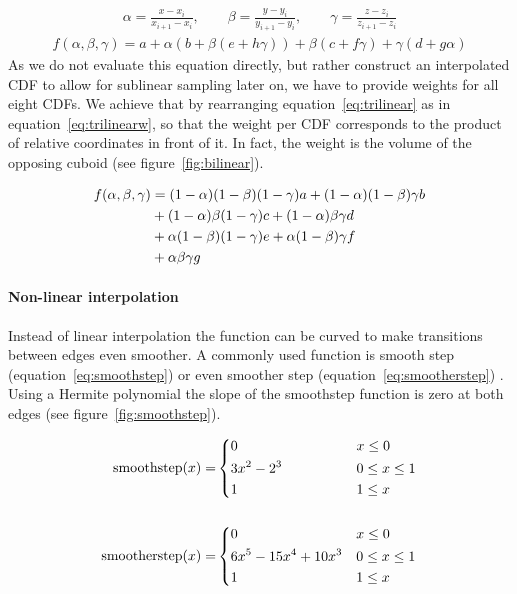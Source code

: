 \begin{align}
    \alpha = \frac{x-x_i}{x_{i+1}-x_i}, \qquad \beta = \frac{y-y_i}{y_{i+1}-y_i}, \qquad \gamma = \frac{z-z_i}{z_{i+1}-z_i}
\end{align}
\begin{align}\label{eq:trilinear}
    f(\alpha, \beta, \gamma) = a + \alpha\left(b + \beta(e + h\gamma)\right) + \beta(c + f\gamma) + \gamma(d + g\alpha)
\end{align}
As we do not evaluate this equation directly, but rather construct an interpolated CDF to allow for sublinear sampling later on, we have to provide weights for all eight CDFs. We achieve that by rearranging equation~\ref{eq:trilinear} as in equation~\ref{eq:trilinearw}, so that the weight per CDF corresponds to the product of relative coordinates in front of it. In fact, the weight is the volume of the opposing cuboid (see figure~\ref{fig:bilinear}).


\begin{align}\label{eq:trilinearw}
    f(\alpha, \beta, \gamma) &= (1-\alpha)(1-\beta)(1-\gamma)a + (1-\alpha)(1-\beta)\gamma b  \notag \\
    &+ (1-\alpha)\beta(1-\gamma)c  + (1-\alpha)\beta\gamma d \\
    &+ \alpha(1-\beta)(1-\gamma)e + \alpha(1-\beta)\gamma f \notag \\
    &+ \alpha\beta\gamma g  \notag
\end{align}

\paragraph{Non-linear interpolation}
Instead of linear interpolation the function can be curved to make transitions between edges even smoother. A commonly used function is smooth step (equation~\ref{eq:smoothstep}) or even smoother step (equation~\ref{eq:smootherstep}) \parencite{ebert2003texturing}. Using a Hermite polynomial the slope of the smoothstep function is zero at both edges (see figure~\ref{fig:smoothstep}).

\begin{align}
    \text{smoothstep}(x) =& 
    \begin{dcases}
        0& x \leq 0\\
        3x^2 - 2^3 \qquad \qquad ~& 0 \leq x \leq 1 \\
        1& 1 \leq x
    \end{dcases} \label{eq:smoothstep} \\ \notag
    \\ 
    \text{smootherstep}(x) =&
    \begin{dcases}
        0& x \leq 0\\
        6x^5 - 15x^4 + 10x^3& 0 \leq x \leq 1 \\
        1& 1 \leq x
    \end{dcases}
    \label{eq:smootherstep}
\end{align}

